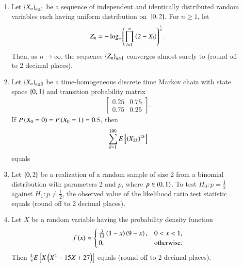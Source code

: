 \documentclass[journal]{IEEEtran}
\begin{document}
\begin{enumerate}
\item Let $\left\{X_n\right\}_{n\geq1}$ be a sequence of independent and identically distributed random variables each having uniform distribution on ${}\left[0,2\right]$. For $n \geq 1$, let
\begin{align*}
Z_n = - \log_e \left( \prod_{i=1}^{n} \left(2 - X_i\right) \right)^{\frac{1}{n}}.
\end{align*}
Then, as $n \to \infty$, the sequence $\left\{Z_n\right\}_{n\geq1}$ converges almost surely to \underline{\hspace{1cm}} (round off to 2 decimal places).

\item Let $\left\{X_n\right\}_{n \geq 0}$ be a time-homogeneous discrete time Markov chain with state space $\left\{0,1\right\}$ and transition probability matrix
\begin{align*}
\begin{bmatrix}
0.25 & 0.75 \\
0.75 & 0.25 
\end{bmatrix}.
\end{align*}
If $P\left(X_0 = 0\right) = P\left(X_0 = 1\right) = 0.5$, then
\begin{align*}
\sum_{k=1}^{100} E {}\left[\left(X_{2k}\right)^{2k}\right]
\end{align*}
equals \underline{\hspace{1cm}}

\item Let $\left\{0,2\right\}$ be a realization of a random sample of size 2 from a binomial distribution with parameters 2 and $p$, where $p \in \left(0,1\right)$. To test $H_0: p = \frac{1}{2}$ against $H_1: p \neq \frac{1}{2}$, the observed value of the likelihood ratio test statistic equals \underline{\hspace{1cm}} (round off to 2 decimal places).

\item Let $X$ be a random variable having the probability density function
\begin{align*}
f\left(x\right) = 
\begin{cases}
\frac{3}{13} \left(1 - x\right) \left(9 - x\right), & 0 < x < 1, \\
0, & \text{otherwise}.
\end{cases}
\end{align*}
Then $\frac{4}{3} E {}\left[X \left(X^2 - 15X + 27\right)\right]$ equals \underline{\hspace{1cm}} (round off to 2 decimal places).


\end{enumerate}
\end{document}
